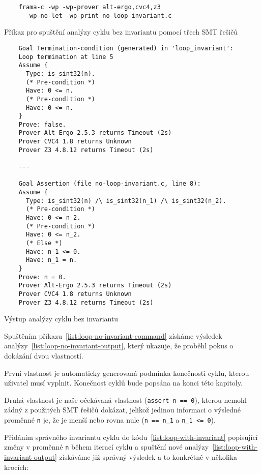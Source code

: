 \begin{listing}[H]
    \begin{verbatim}
    frama-c -wp -wp-prover alt-ergo,cvc4,z3
      -wp-no-let -wp-print no-loop-invariant.c
    \end{verbatim}
    \caption{Příkaz pro spuštění analýzy cyklu bez invariantu pomocí třech SMT řešičů}
    \label{list:loop-no-invariant-command}
\end{listing}

\begin{listing}[H]
    \begin{verbatim}
    Goal Termination-condition (generated) in 'loop_invariant':
    Loop termination at line 5
    Assume {
      Type: is_sint32(n).
      (* Pre-condition *)
      Have: 0 <= n.
      (* Pre-condition *)
      Have: 0 <= n.
    }
    Prove: false.
    Prover Alt-Ergo 2.5.3 returns Timeout (2s)
    Prover CVC4 1.8 returns Unknown
    Prover Z3 4.8.12 returns Timeout (2s)

    ---

    Goal Assertion (file no-loop-invariant.c, line 8):
    Assume {
      Type: is_sint32(n) /\ is_sint32(n_1) /\ is_sint32(n_2).
      (* Pre-condition *)
      Have: 0 <= n_2.
      (* Pre-condition *)
      Have: 0 <= n_2.
      (* Else *)
      Have: n_1 <= 0.
      Have: n_1 = n.
    }
    Prove: n = 0.
    Prover Alt-Ergo 2.5.3 returns Timeout (2s)
    Prover CVC4 1.8 returns Unknown
    Prover Z3 4.8.12 returns Timeout (2s)
    \end{verbatim}
    \caption{Výstup analýzy cyklu bez invariantu}
    \label{list:loop-no-invariant-output}
\end{listing}

Spuštěním příkazu~\ref{list:loop-no-invariant-command} získáme výsledek analýzy~\ref{list:loop-no-invariant-output},
který ukazuje, že proběhl pokus o dokázání dvou vlastností.

První vlastnost je automaticky generovaná podmínka konečnosti cyklu, kterou uživatel musí vyplnit.
Konečnost cyklů bude popsána na konci této kapitoly.

Druhá vlastnost je naše očekávaná vlastnost (\texttt{assert n == 0}),
kterou nemohl zádný z použitých SMT řešičů dokázat,
jelikož jedinou informaci o výsledné proměnné \texttt{n} je,
že je menší nebo rovna nule (\texttt{n == n\_1} a \texttt{n\_1 <= 0}).


Přidáním správného invariantu cyklu do kódu~\ref{list:loop-with-invariant}
popisující změny v proměnné \texttt{n} během iterací cyklu
a spuštění nové analýzy~\ref{list:loop-with-invariant-output} získáváme již správný výsledek
a to konkrétně v několika krocích:


